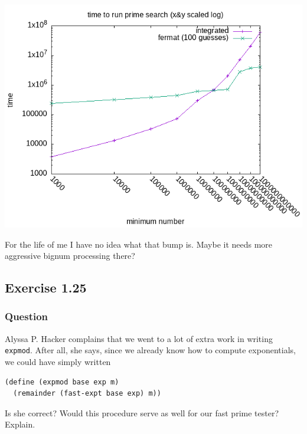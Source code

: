 \documentclass[final,fleqn,titlepage,twoside]{article}
\begin{document}
\begin{center}
\includegraphics[width=.9\linewidth]{1/fig/1-24-2.png}
\end{center}

For the life of me I have no idea what that bump is. Maybe it needs more
aggressive bignum processing there?

\subsection{Exercise 1.25}
\label{sec:org412922b}
\subsubsection{Question}
\label{sec:org4318323}
Alyssa P. Hacker complains that we went to a lot of extra work in writing
\texttt{expmod}. After all, she says, since we already know how to compute
exponentials, we could have simply written

\begin{verbatim}
(define (expmod base exp m)
  (remainder (fast-expt base exp) m))
\end{verbatim}

Is she correct? Would this procedure serve as well for our fast prime tester?
Explain.
\end{document}
